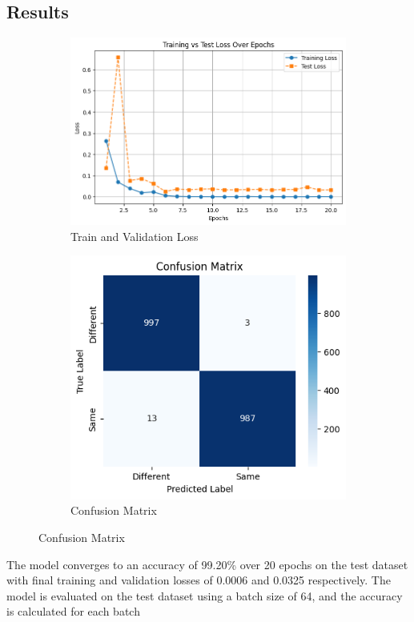 \documentclass{article}
\begin{document}
\subsection*{Results}
\begin{figure}[ht]
  \centering
  \begin{subfigure}{0.45\textwidth}
    \includegraphics[width=\textwidth]{images/q2_train_test_loss.png}
    \caption{Train and Validation Loss}
    \label{fig:train_val_loss}
  \end{subfigure}
  \hspace{0.5cm}
  \begin{subfigure}{0.35\textwidth}
    \includegraphics[width=\textwidth]{images/q2_conf_matrix.png}
    \caption{Confusion Matrix}
    \label{fig:conf_matrix}
  \end{subfigure}
\end{figure}
The model converges to an accuracy of 99.20\% over 20 epochs on the test dataset with final training and validation losses of 0.0006 and 0.0325 respectively. The model is evaluated on the test dataset using a batch size of 64, and the accuracy is calculated for each batch
\end{document}
